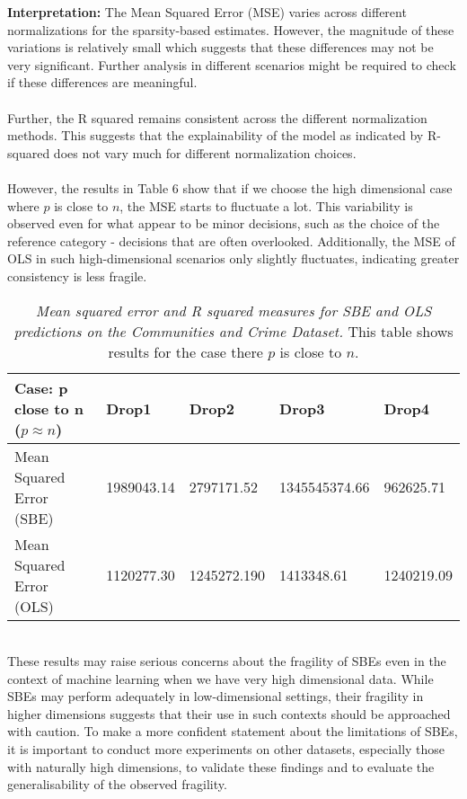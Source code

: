\textbf{Interpretation:} 
The Mean Squared Error (MSE) varies across different normalizations for the sparsity-based estimates. However, the magnitude of these variations is relatively small which suggests that these differences may not be very significant. Further analysis in different scenarios might be required to check if these differences are meaningful. \\
\\
Further, the R squared remains consistent across the different normalization methods. This suggests that the explainability of the model as indicated by R-squared does not vary much for different normalization choices. \\
\\
However, the results in Table 6 show that if we choose the high dimensional case where $p$ is close to $n$, the MSE starts to fluctuate a lot. This variability is observed even for what appear to be minor decisions, such as the choice of the reference category - decisions that are often overlooked. Additionally, the MSE of OLS in such high-dimensional scenarios only slightly fluctuates, indicating greater consistency is less fragile.
\begin{table}[h!]
\renewcommand{\arraystretch}{1.5}
\centering
\begin{tabular}{||l l l l l||} 
 \hline
 \hline
 Case: p close to n ($p \approx n$) & Drop1 & Drop2 & Drop3 & Drop4 \\ [0.5ex] 
 \hline \hline
 Mean Squared Error (SBE) & 1989043.14 & 2797171.52 & 1345545374.66 & 962625.71 \\ 
 Mean Squared Error (OLS) & 1120277.30 & 1245272.190 & 1413348.61 & 1240219.09 \\ 
 \hline \hline
\end{tabular}
\caption{\textit{Mean squared error and R squared measures for SBE and OLS predictions on the Communities and Crime Dataset.} This table shows results for the case there $p$ is close to $n$.} 
\label{table:1}
\end{table}
\\
These results may raise serious concerns about the fragility of SBEs even in the context of machine learning when we have very high dimensional data. While SBEs may perform adequately in low-dimensional settings, their fragility in higher dimensions suggests that their use in such contexts should be approached with caution. To make a more confident statement about the limitations of SBEs, it is important to conduct more experiments on other datasets, especially those with naturally high dimensions, to validate these findings and to evaluate the generalisability of the observed fragility.